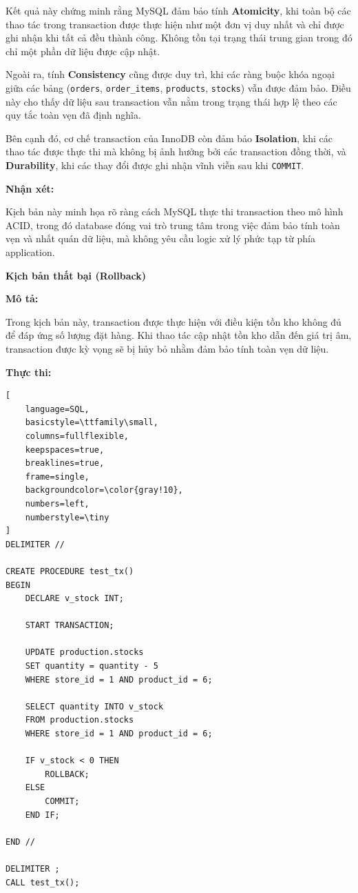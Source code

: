 Kết quả này chứng minh rằng MySQL đảm bảo tính \textbf{Atomicity}, khi toàn bộ các thao tác trong transaction được thực hiện như một đơn vị duy nhất và chỉ được ghi nhận khi tất cả đều thành công. Không tồn tại trạng thái trung gian trong đó chỉ một phần dữ liệu được cập nhật.

Ngoài ra, tính \textbf{Consistency} cũng được duy trì, khi các ràng buộc khóa ngoại giữa các bảng (\texttt{orders}, \texttt{order\_items}, \texttt{products}, \texttt{stocks}) vẫn được đảm bảo. Điều này cho thấy dữ liệu sau transaction vẫn nằm trong trạng thái hợp lệ theo các quy tắc toàn vẹn đã định nghĩa.

Bên cạnh đó, cơ chế transaction của InnoDB còn đảm bảo \textbf{Isolation}, khi các thao tác được thực thi mà không bị ảnh hưởng bởi các transaction đồng thời, và \textbf{Durability}, khi các thay đổi được ghi nhận vĩnh viễn sau khi \texttt{COMMIT}.

\textbf{Nhận xét:}

Kịch bản này minh họa rõ ràng cách MySQL thực thi transaction theo mô hình ACID, trong đó database đóng vai trò trung tâm trong việc đảm bảo tính toàn vẹn và nhất quán dữ liệu, mà không yêu cầu logic xử lý phức tạp từ phía application.

\textbf{Kịch bản thất bại (Rollback)}


\textbf{Mô tả:}

Trong kịch bản này, transaction được thực hiện với điều kiện tồn kho không đủ để đáp ứng số lượng đặt hàng. Khi thao tác cập nhật tồn kho dẫn đến giá trị âm, transaction được kỳ vọng sẽ bị hủy bỏ nhằm đảm bảo tính toàn vẹn dữ liệu.

\textbf{Thực thi:}

\begin{lstlisting}[
    language=SQL,
    basicstyle=\ttfamily\small,
    columns=fullflexible,
    keepspaces=true,
    breaklines=true,
    frame=single,
    backgroundcolor=\color{gray!10},
    numbers=left,
    numberstyle=\tiny
]
DELIMITER //

CREATE PROCEDURE test_tx()
BEGIN
    DECLARE v_stock INT;

    START TRANSACTION;

    UPDATE production.stocks 
    SET quantity = quantity - 5
    WHERE store_id = 1 AND product_id = 6;

    SELECT quantity INTO v_stock
    FROM production.stocks 
    WHERE store_id = 1 AND product_id = 6;

    IF v_stock < 0 THEN
        ROLLBACK;
    ELSE
        COMMIT;
    END IF;

END //

DELIMITER ;
CALL test_tx();

\end{lstlisting}

